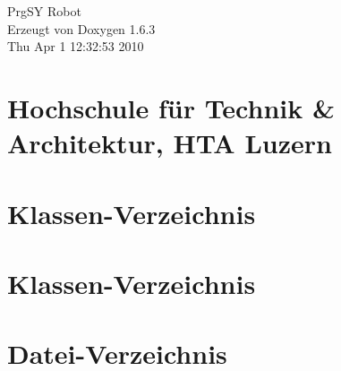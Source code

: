 \documentclass[a4paper]{book}
\begin{document}
\hypersetup{pageanchor=false}
\begin{titlepage}
\vspace*{7cm}
\begin{center}
{\Large PrgSY Robot }\\
\vspace*{1cm}
{\large Erzeugt von Doxygen 1.6.3}\\
\vspace*{0.5cm}
{\small Thu Apr 1 12:32:53 2010}\\
\end{center}
\end{titlepage}
\clearemptydoublepage
{}
\tableofcontents
\clearemptydoublepage
{}
\hypersetup{pageanchor=true}
\chapter{Hochschule f\"{u}r Technik \& Architektur, HTA Luzern}
\label{index}\hypertarget{index}{}
\chapter{Klassen-\/Verzeichnis}

\chapter{Klassen-\/Verzeichnis}

\chapter{Datei-\/Verzeichnis}

\end{document}

